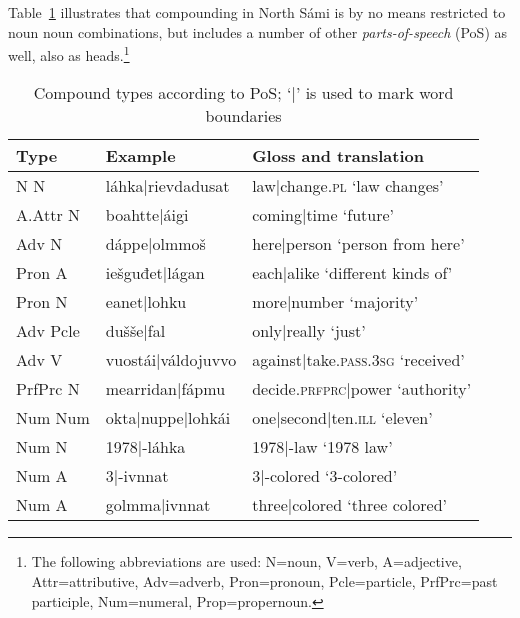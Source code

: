 \documentclass[free]{flammie}
\begin{document}
Table~\ref{pos-compounds} illustrates that compounding in North Sámi
is by no means restricted to noun noun combinations, but includes a
number of other \textit{parts-of-speech} (PoS) as well, also as
heads.\footnote{The following abbreviations are used: N=noun, V=verb, A=adjective, Attr=attributive,
  Adv=adverb, Pron=pronoun, Pcle=particle, PrfPrc=past participle, Num=numeral, Prop=propernoun.}


\begin{table}[h]
\small
\begin{center}
\begin{tabular}{|p{1.1cm}|p{2.4cm}|p{2.8cm}|}
\hline \bf Type & \bf Example & \bf Gloss and translation \\ \hline
\hline
N N & láhka$|$rievdadusat & law$|$change\textsc{.pl} `law changes'\\
A.Attr N & boahtte$|$áigi & coming$|$time `future'\\
\hline
\hline
Adv N & dáppe$|$olmmoš & here$|$person `person from here'\\
Pron A & iešguđet$|$lágan & each$|$alike `different kinds of'\\
Pron N & eanet$|$lohku & more$|$number `majority'\\
Adv Pcle & dušše$|$fal & only$|$really `just' \\
Adv V & vuostái$|$váldojuvvo & against$|$take\textsc{.pass.3sg} `received' \\
PrfPrc N & mearridan$|$fápmu & decide\textsc{.prfprc}$|$power `authority'\\
Num Num & okta$|$nuppe$|$lohkái & one$|$second$|$ten\textsc{.ill} `eleven'\\ %
Num N & 1978$|$-láhka & 1978$|$-law `1978 law'\\ %
Num A & 3$|$-ivnnat & 3$|$-colored `3-colored'\\
Num A & golmma$|$ivnnat & three$|$colored `three colored'\\ %
\hline
\end{tabular}
\end{center}
\caption{\label{pos-compounds} Compound types according to PoS; `$|$' is used to mark word boundaries}
\end{table}
\end{document}
